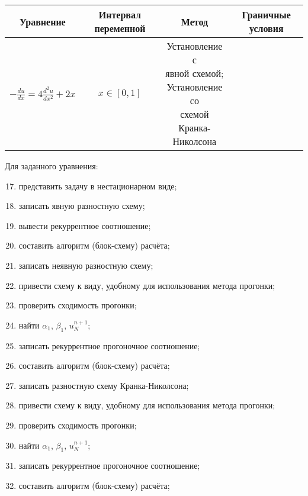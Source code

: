 \documentclass[12pt, a4paper]{report}
\begin{document}
	\begin{center}
		\begin{tabular}{||c|c|c|c||}
			\hline
			Уравнение & Интервал переменной & Метод & Граничные условия \\

			\hline
			$ -\frac{du}{dx}=4\frac{d^{2}u}{dx^{2}}+2x$ & $x \in [0, 1]$ & \makecell{Установление с \\ явной схемой; \\ Установление со \\ схемой Кранка- \\ Николсона} & \makecell{$ \begin{cases} \frac{du}{dx}(x = 0) = 2 \\ u(x = 1) = 2 \end{cases}$} \\

			\hline
		\end{tabular}
	\end{center}
	\par
	Для заданного уравнения:
	\begin{enumerate}
		\setcounter{enumi}{16}
		\item представить задачу в нестационарном виде;
		\item записать явную разностную схему;
		\item вывести рекуррентное соотношение;
		\item составить алгоритм (блок-схему) расчёта;
		\item записать неявную разностную схему;
		\item привести схему к виду, удобному для использования метода прогонки;
		\item проверить сходимость прогонки;
		\item найти $\alpha_1$, $\beta_1$, $u_{N}^{n+1}$;
		\item записать рекуррентное прогоночное соотношение;
		\item составить алгоритм (блок-схему) расчёта;
		\item записать разностную схему Кранка-Николсона;
		\item привести схему к виду, удобному для использования метода прогонки;
		\item проверить сходимость прогонки;
		\item найти $\alpha_1$, $\beta_1$, $u_{N}^{n+1}$;
		\item записать рекуррентное прогоночное соотношение;
		\item составить алгоритм (блок-схему) расчёта;
	\end{enumerate}
\end{document}
